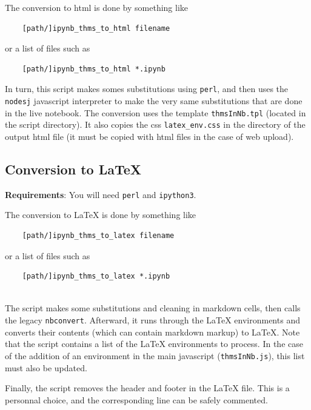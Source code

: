 The conversion to html is done by something like

\begin{verbatim}
    [path/]ipynb_thms_to_html filename
\end{verbatim}

or a list of files such as

\begin{verbatim}
    [path/]ipynb_thms_to_html *.ipynb
\end{verbatim}

In turn, this script makes somes substitutions using \texttt{perl}, and
then uses the \texttt{nodesj} javascript interpreter to make the very
same substitutions that are done in the live notebook. The conversion
uses the template \texttt{thmsInNb.tpl} (located in the script
directory). It also copies the css \texttt{latex\_env.css} in the
directory of the output html file (it must be copied with html files in
the case of web upload).

    \subsection{Conversion to LaTeX}\label{conversion-to-latex}

    \textbf{Requirements}: You will need \texttt{perl} and
\texttt{ipython3}.

The conversion to LaTeX is done by something like

\begin{verbatim}
    [path/]ipynb_thms_to_latex filename
\end{verbatim}

or a list of files such as

\begin{verbatim}
    [path/]ipynb_thms_to_latex *.ipynb
    
\end{verbatim}

The script makes some substitutions and cleaning in markdown cells, then
calls the legacy \texttt{nbconvert}. Afterward, it runs through the
LaTeX environments and converts their contents (which can contain
markdown markup) to LaTeX. Note that the script contains a list of the
LaTeX environments to process. In the case of the addition of an
environment in the main javascript (\texttt{thmsInNb.js}), this list
must also be updated.

Finally, the script removes the header and footer in the LaTeX file.
This is a personnal choice, and the corresponding line can be safely
commented.

